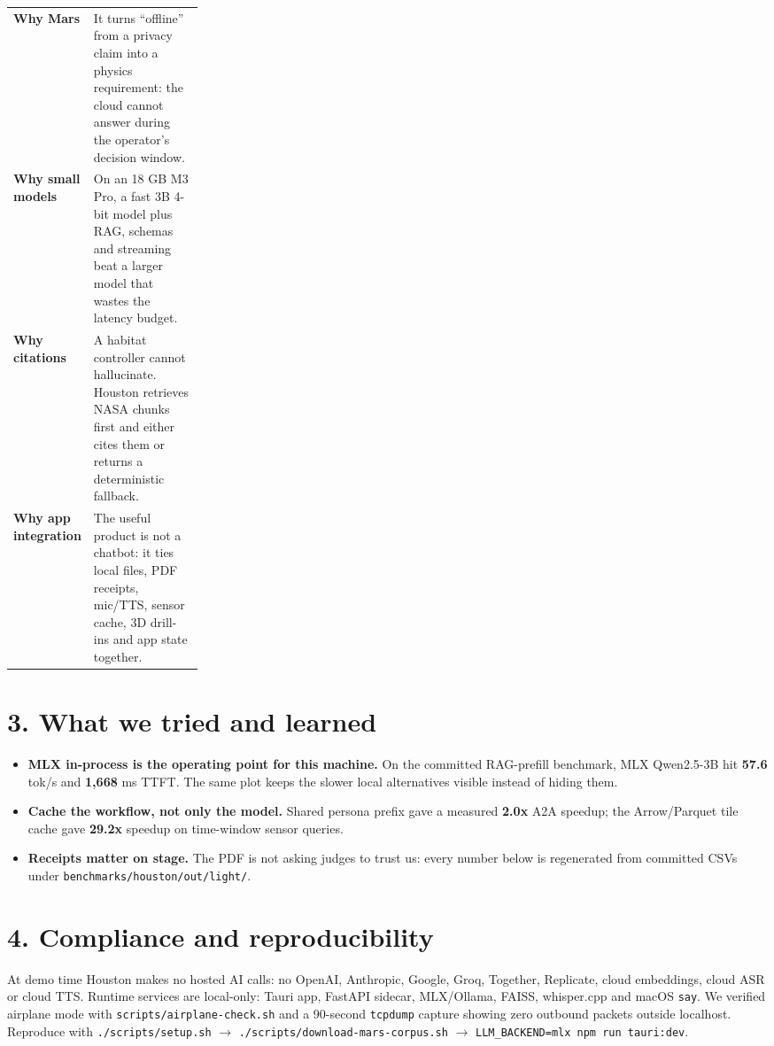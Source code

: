 \documentclass[9pt]{extarticle}
\newcommand{\code}[1]{\texttt{\small #1}}
\newcommand{\metric}[2]{\textbf{\color{cyan}#1} {\small #2}}
\begin{document}
\begin{tabularx}{\linewidth}{>{\bfseries}p{0.25\linewidth}X}
\toprule
Why Mars & It turns ``offline'' from a privacy claim into a physics requirement:
the cloud cannot answer during the operator's decision window.\\
Why small models & On an 18 GB M3 Pro, a fast 3B 4-bit model plus RAG, schemas
and streaming beat a larger model that wastes the latency budget.\\
Why citations & A habitat controller cannot hallucinate. Houston retrieves NASA
chunks first and either cites them or returns a deterministic fallback.\\
Why app integration & The useful product is not a chatbot: it ties local files,
PDF receipts, mic/TTS, sensor cache, 3D drill-ins and app state together.\\
\bottomrule
\end{tabularx}

\section{3. What we tried and learned}

\begin{itemize}
  \item \textbf{MLX in-process is the operating point for this machine.} On the
  committed RAG-prefill benchmark, MLX Qwen2.5-3B hit \metric{57.6}{tok/s} and
  \metric{1,668}{ms TTFT}. The same plot keeps the slower local alternatives
  visible instead of hiding them.
  \item \textbf{Cache the workflow, not only the model.} Shared persona prefix
  gave a measured \metric{2.0x}{A2A speedup}; the Arrow/Parquet tile cache gave
  \metric{29.2x}{speedup} on time-window sensor queries.
  \item \textbf{Receipts matter on stage.} The PDF is not asking judges to
  trust us: every number below is regenerated from committed CSVs under
  \code{benchmarks/houston/out/light/}.
\end{itemize}

\section{4. Compliance and reproducibility}

At demo time Houston makes no hosted AI calls: no OpenAI, Anthropic, Google,
Groq, Together, Replicate, cloud embeddings, cloud ASR or cloud TTS. Runtime
services are local-only: Tauri app, FastAPI sidecar, MLX/Ollama, FAISS,
whisper.cpp and macOS \code{say}. We verified airplane mode with
\code{scripts/airplane-check.sh} and a 90-second \code{tcpdump} capture showing
zero outbound packets outside localhost. Reproduce with
\code{./scripts/setup.sh} \(\rightarrow\) \code{./scripts/download-mars-corpus.sh}
\(\rightarrow\) \code{LLM\_BACKEND=mlx npm run tauri:dev}.
\end{document}
